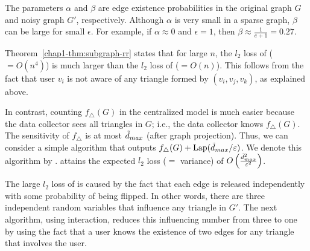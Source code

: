 The parameters $\alpha$ and $\beta$ are edge existence probabilities in the original graph $G$ and noisy graph $G'$, respectively. 
Although $\alpha$ is very small in a sparse graph, $\beta$ can be large for small $\epsilon$. 
For example, if $\alpha \approx 0$ and $\epsilon=1$, then $\beta \approx \frac{1}{e+1} = 0.27$. 

Theorem~\ref{chap1-thm:subgraph-rr} states that for large $n$, the $l_2$ loss of  
($=O(n^4)$) 
is much larger than the $l_2$ loss of  ($=O(n)$). 
This follows from the fact that user $v_i$ 
is not aware of any triangle formed by $(v_i, v_j, v_k)$, as explained above. 

In contrast, counting $f_\triangle(G)$ in the centralized model is much easier because the data collector sees all triangles in $G$; i.e., the data collector knows $f_\triangle(G)$. 
The 
sensitivity of $f_\triangle$ 
is 
at most $\tilde{d}_{max}$ (after graph projection). 
Thus, 
we can consider a simple algorithm that 
outputs $f_{\triangle}(G) + \textrm{Lap}(\tilde{d}_{max}/\varepsilon)$. 
We denote this algorithm by . 
 attains the expected $l_2$ loss ($=$ variance) of $O\left(\frac{\tilde{d}_{max}^2}{\varepsilon^2}\right)$. 


The large $l_2$ loss of  is caused by the fact that 
each edge is released independently with
some probability of being flipped. 
In other words, 
there are three independent random
variables that influence 
any triangle in $G'$. 
The next algorithm,
using interaction, 
reduces 
this influencing number 
from three to one 
by using the fact that 
a user 
knows 
the existence of two edges for any triangle that involves the user. 

